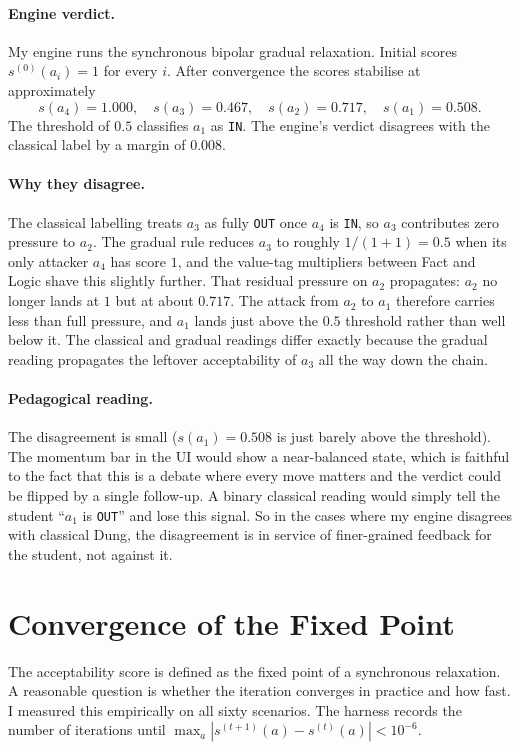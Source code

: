 \paragraph{Engine verdict.}
My engine runs the synchronous bipolar gradual relaxation. Initial scores $s^{(0)}(a_i)=1$ for every $i$. After convergence the scores stabilise at approximately
\[
    s(a_4) = 1.000, \quad s(a_3) = 0.467, \quad s(a_2) = 0.717, \quad s(a_1) = 0.508.
\]
The threshold of $0.5$ classifies $a_1$ as \texttt{IN}. The engine's verdict disagrees with the classical label by a margin of $0.008$.

\paragraph{Why they disagree.}
The classical labelling treats $a_3$ as fully \texttt{OUT} once $a_4$ is \texttt{IN}, so $a_3$ contributes zero pressure to $a_2$. The gradual rule reduces $a_3$ to roughly $1/(1+1)=0.5$ when its only attacker $a_4$ has score $1$, and the value-tag multipliers between Fact and Logic shave this slightly further. That residual pressure on $a_2$ propagates: $a_2$ no longer lands at $1$ but at about $0.717$. The attack from $a_2$ to $a_1$ therefore carries less than full pressure, and $a_1$ lands just above the $0.5$ threshold rather than well below it. The classical and gradual readings differ exactly because the gradual reading propagates the leftover acceptability of $a_3$ all the way down the chain.

\paragraph{Pedagogical reading.}
The disagreement is small ($s(a_1)=0.508$ is just barely above the threshold). The momentum bar in the UI would show a near-balanced state, which is faithful to the fact that this is a debate where every move matters and the verdict could be flipped by a single follow-up. A binary classical reading would simply tell the student ``$a_1$ is \texttt{OUT}'' and lose this signal. So in the cases where my engine disagrees with classical Dung, the disagreement is in service of finer-grained feedback for the student, not against it.

\section{Convergence of the Fixed Point}
\label{sec:eval_convergence}
The acceptability score is defined as the fixed point of a synchronous relaxation. A reasonable question is whether the iteration converges in practice and how fast. I measured this empirically on all sixty scenarios. The harness records the number of iterations until $\max_a |s^{(t+1)}(a) - s^{(t)}(a)| < 10^{-6}$.

